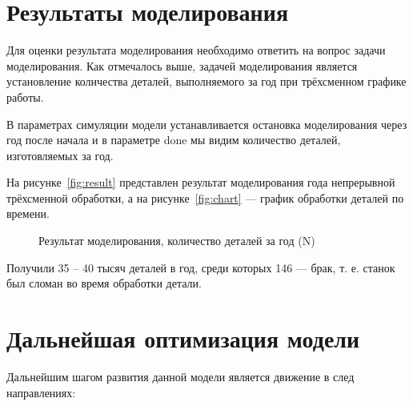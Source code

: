 \section{Результаты моделирования}

Для оценки результата моделирования необходимо ответить на вопрос задачи моделирования. Как отмечалось выше, задачей моделирования является установление количества деталей, выполняемого за год при трёхсменном графике работы.

В параметрах симуляции модели устанавливается остановка моделирования через год после начала и в параметре done мы видим количество деталей, изготовляемых за год.

На рисунке~\ref{fig:result} представлен результат моделирования года непрерывной трёхсменной обработки, а на рисунке~\ref{fig:chart} --- график обработки деталей по времени.

\begin{figure}[ht]
    \qquad
    \caption{Результат моделирования, количество деталей за год (N)}
    \label{fig:resultchart}
\end{figure}

Получили 35 -- 40 тысяч деталей в год, среди которых 146 --- брак, т. е. станок был сломан во время обработки детали.

\section{Дальнейшая оптимизация модели}

Дальнейшим шагом развития данной модели является движение в след направлениях:

